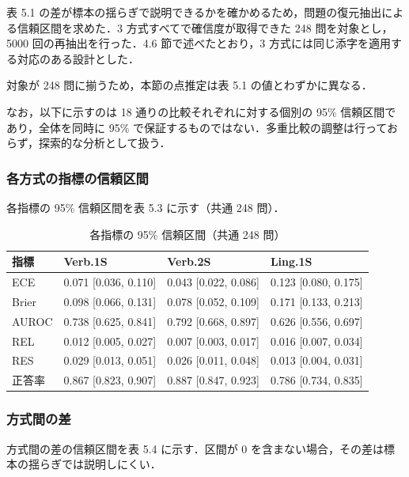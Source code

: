 表 5.1 の差が標本の揺らぎで説明できるかを確かめるため，問題の復元抽出による信頼区間を求めた．3 方式すべてで確信度が取得できた 248 問を対象とし，5000 回の再抽出を行った．4.6 節で述べたとおり，3 方式には同じ添字を適用する対応のある設計とした．

対象が 248 問に揃うため，本節の点推定は表 5.1 の値とわずかに異なる．

なお，以下に示すのは 18 通りの比較それぞれに対する個別の 95\% 信頼区間であり，全体を同時に 95\% で保証するものではない．多重比較の調整は行っておらず，探索的な分析として扱う．

\subsubsection{各方式の指標の信頼区間}

各指標の 95\% 信頼区間を表 5.3 に示す（共通 248 問）．

\begin{table}[t]
\centering
\small
\caption{各指標の 95\% 信頼区間（共通 248 問）}
\label{tab:5.3}
\begin{tabular}{|l|l|l|l|}
\hline
指標 & Verb.1S & Verb.2S & Ling.1S \\
\hline
ECE & 0.071 [0.036, 0.110] & 0.043 [0.022, 0.086] & 0.123 [0.080, 0.175] \\
Brier & 0.098 [0.066, 0.131] & 0.078 [0.052, 0.109] & 0.171 [0.133, 0.213] \\
AUROC & 0.738 [0.625, 0.841] & 0.792 [0.668, 0.897] & 0.626 [0.556, 0.697] \\
REL & 0.012 [0.005, 0.027] & 0.007 [0.003, 0.017] & 0.016 [0.007, 0.034] \\
RES & 0.029 [0.013, 0.051] & 0.026 [0.011, 0.048] & 0.013 [0.004, 0.031] \\
正答率 & 0.867 [0.823, 0.907] & 0.887 [0.847, 0.923] & 0.786 [0.734, 0.835] \\
\hline
\end{tabular}
\end{table}

\subsubsection{方式間の差}

方式間の差の信頼区間を表 5.4 に示す．区間が 0 を含まない場合，その差は標本の揺らぎでは説明しにくい．

